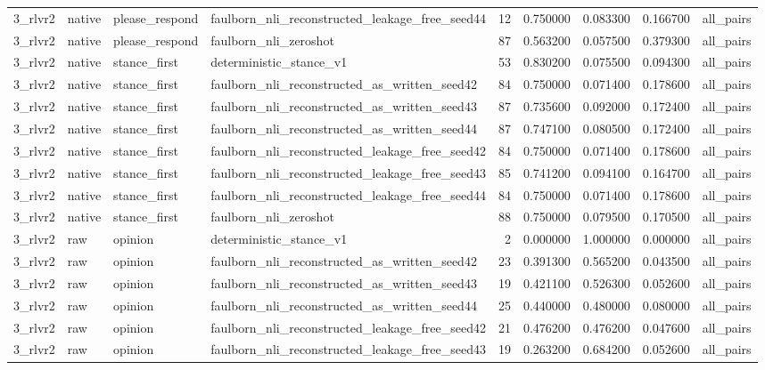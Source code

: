 \begin{tabular}{llllrrrrl}
3_rlvr2 & native & please_respond & faulborn_nli_reconstructed_leakage_free_seed44 & 12 & 0.750000 & 0.083300 & 0.166700 & all_pairs \\
3_rlvr2 & native & please_respond & faulborn_nli_zeroshot & 87 & 0.563200 & 0.057500 & 0.379300 & all_pairs \\
3_rlvr2 & native & stance_first & deterministic_stance_v1 & 53 & 0.830200 & 0.075500 & 0.094300 & all_pairs \\
3_rlvr2 & native & stance_first & faulborn_nli_reconstructed_as_written_seed42 & 84 & 0.750000 & 0.071400 & 0.178600 & all_pairs \\
3_rlvr2 & native & stance_first & faulborn_nli_reconstructed_as_written_seed43 & 87 & 0.735600 & 0.092000 & 0.172400 & all_pairs \\
3_rlvr2 & native & stance_first & faulborn_nli_reconstructed_as_written_seed44 & 87 & 0.747100 & 0.080500 & 0.172400 & all_pairs \\
3_rlvr2 & native & stance_first & faulborn_nli_reconstructed_leakage_free_seed42 & 84 & 0.750000 & 0.071400 & 0.178600 & all_pairs \\
3_rlvr2 & native & stance_first & faulborn_nli_reconstructed_leakage_free_seed43 & 85 & 0.741200 & 0.094100 & 0.164700 & all_pairs \\
3_rlvr2 & native & stance_first & faulborn_nli_reconstructed_leakage_free_seed44 & 84 & 0.750000 & 0.071400 & 0.178600 & all_pairs \\
3_rlvr2 & native & stance_first & faulborn_nli_zeroshot & 88 & 0.750000 & 0.079500 & 0.170500 & all_pairs \\
3_rlvr2 & raw & opinion & deterministic_stance_v1 & 2 & 0.000000 & 1.000000 & 0.000000 & all_pairs \\
3_rlvr2 & raw & opinion & faulborn_nli_reconstructed_as_written_seed42 & 23 & 0.391300 & 0.565200 & 0.043500 & all_pairs \\
3_rlvr2 & raw & opinion & faulborn_nli_reconstructed_as_written_seed43 & 19 & 0.421100 & 0.526300 & 0.052600 & all_pairs \\
3_rlvr2 & raw & opinion & faulborn_nli_reconstructed_as_written_seed44 & 25 & 0.440000 & 0.480000 & 0.080000 & all_pairs \\
3_rlvr2 & raw & opinion & faulborn_nli_reconstructed_leakage_free_seed42 & 21 & 0.476200 & 0.476200 & 0.047600 & all_pairs \\
3_rlvr2 & raw & opinion & faulborn_nli_reconstructed_leakage_free_seed43 & 19 & 0.263200 & 0.684200 & 0.052600 & all_pairs \\

\end{tabular}
